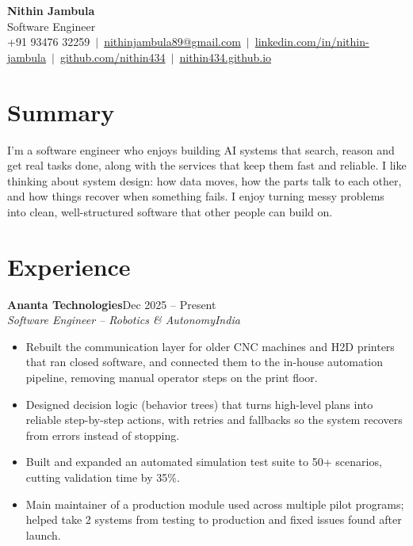 \documentclass[a4paper,10pt]{article}
\newcommand{\job}[4]{\textbf{#1}\hfill #2\\\textit{#3}\hfill\textit{#4}\par\vspace{-2pt}}
\newcommand{\gap}{\vspace{5pt}}
\begin{document}
\begin{center}
  {\color{accent}\Huge\textbf{Nithin Jambula}}\\[3pt]
  {\large Software Engineer}\\[4pt]
  \small
  +91 93476 32259 \,$|$\,
  \href{mailto:nithinjambula89@gmail.com}{nithinjambula89@gmail.com} \,$|$\,
  \href{https://linkedin.com/in/nithin-jambula}{linkedin.com/in/nithin-jambula} \,$|$\,
  \href{https://github.com/nithin434}{github.com/nithin434} \,$|$\,
  \href{https://nithin434.github.io}{nithin434.github.io}
\end{center}

\section{Summary}
I'm a software engineer who enjoys building AI systems that search, reason and get real tasks done, along with the services that keep them fast and reliable.
I like thinking about system design: how data moves, how the parts talk to each other, and how things recover when something fails.
I enjoy turning messy problems into clean, well-structured software that other people can build on.

\section{Experience}

\job{Ananta Technologies}{Dec 2025 -- Present}{Software Engineer -- Robotics \& Autonomy}{India}
\begin{itemize}
  \item Rebuilt the communication layer for older CNC machines and H2D printers that ran closed software, and connected them to the in-house automation pipeline, removing manual operator steps on the print floor.
  \item Designed decision logic (behavior trees) that turns high-level plans into reliable step-by-step actions, with retries and fallbacks so the system recovers from errors instead of stopping.
  \item Built and expanded an automated simulation test suite to 50+ scenarios, cutting validation time by 35\%.
  \item Main maintainer of a production module used across multiple pilot programs; helped take 2 systems from testing to production and fixed issues found after launch.
\end{itemize}
\gap
\end{document}
